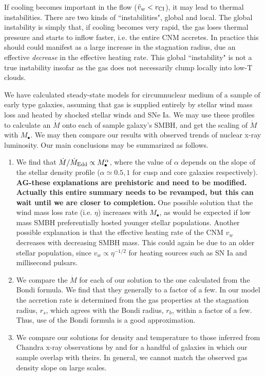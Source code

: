 \documentclass[usenatbib,fleqn]{mn2e}
\newcommand{\Mdot}{\dot{M}}
\newcommand{\eddr}{\dot{M}/\dot{M}_{\rm Edd}}
\newcommand{\rs}{r_s}
\newcommand{\rb}{r_b}
\newcommand{\Mbh}[1][]{M_{\bullet#1}}
\begin{document}
If cooling becomes important in the flow ($\tilde{v}_{w} < v_{\rm CI}$), it may lead to thermal instabilities.  There are two kinds of ``instabilities", global and local.  The global instability is simply that, if cooling becomes very rapid, the gas loses thermal pressure and starts to inflow faster, i.e. the entire CNM accretes.  In
practice this should could manifest as a large increase in the stagnation radius, due an effective {\it decrease} in the effective heating rate.  This global ``instability" is not a true instability insofar as the gas does not necessarily clump locally into low-T clouds.


  We have calculated steady-state models for circumnuclear medium of a
  sample of early type galaxies, assuming that gas is supplied
  entirely by stellar wind mass loss and heated by shocked stellar
  winds and SNe Ia. We may use these profiles to calculate an $\Mdot$
  onto each of sample galaxy's SMBH, and get the scaling of $\Mdot$
  with $\Mbh$. We may then compare our results with observed trends of
  nuclear x-ray luminosity. Our main conclusions may be summarized as
  follows.

  \begin{enumerate}
  \item We find that $\eddr \propto \Mbh^{\alpha}$, where the value of
    $\alpha$ depends on the slope of the stellar density profile
    ($\alpha\simeq0.5,1$ for cusp and core galaxies
    respectively). {\bf AG-these explanations are prehistoric and need
      to be modified. Actually this entire summary needs to be
      revamped, but this can wait until we are closer to completion.}
    One possible solution that the wind mass loss rate (i.e. $\eta$)
    increases with $\Mbh$, as would be expected if low mass SMBH
    preferentially hosted younger stellar populations. Another
    possible explanation is that the effective heating rate of the CNM
    $v_{w}$ decreases with decreasing SMBH mass. This could again be
    due to an older stellar population, since $v_{w} \propto
    \eta^{−1/2}$ for heating sources such as SN Ia and millisecond
    pulsars.
  \item We compare the $\Mdot$ for each of our solution to the one
    calculated from the Bondi formula. We find that they generally to
    a factor of a few. In our model the accretion rate is determined
    from the gas properties at the stagnation radius, $\rs$, which
    agrees with the Bondi radius, $\rb$, within a factor of a
    few. Thus, use of the Bondi formula is a good approximation.
  \item We compare our solutions for density and temperature to those
    inferred from Chandra x-ray observations by \citet{AllenDunn+:2006a}
    and \citet{RussellMcNamara+:2013a} for a handful of galaxies in
    which our sample overlap with theirs. In general, we cannot match
    the observed gas density slope on large scales. 
  \end{enumerate}
  
\end{document}
